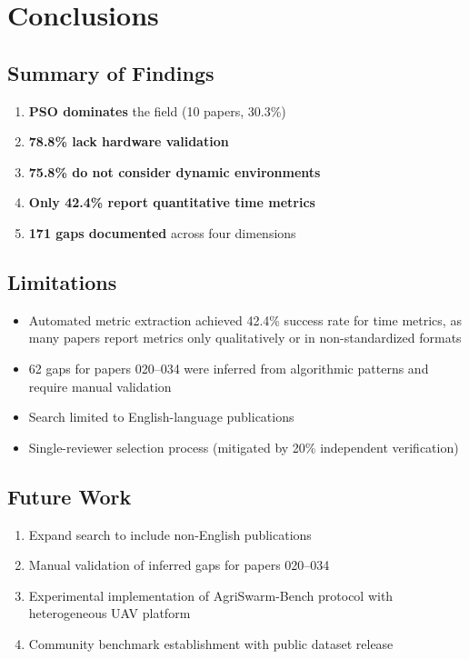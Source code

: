 \documentclass[review, 12pt, times]{elsarticle}
\begin{document}
\section{Conclusions}

\subsection{Summary of Findings}

\begin{enumerate}
  \item \textbf{PSO dominates} the field (10 papers, 30.3\%)
  \item \textbf{78.8\% lack hardware validation}
  \item \textbf{75.8\% do not consider dynamic environments}
  \item \textbf{Only 42.4\% report quantitative time metrics}
  \item \textbf{171 gaps documented} across four dimensions
\end{enumerate}

\subsection{Limitations}
\label{sec:limitations}

\begin{itemize}
  \item Automated metric extraction achieved 42.4\% success
  rate for time metrics, as many papers report metrics only
  qualitatively or in non-standardized formats
  \item 62 gaps for papers 020--034 were inferred from
  algorithmic patterns and require manual validation
  \item Search limited to English-language publications
  \item Single-reviewer selection process (mitigated by
  20\% independent verification)
\end{itemize}

\subsection{Future Work}

\begin{enumerate}
  \item Expand search to include non-English publications
  \item Manual validation of inferred gaps for papers
  020--034
  \item Experimental implementation of AgriSwarm-Bench
  protocol with heterogeneous UAV platform
  \item Community benchmark establishment with public
  dataset release
\end{enumerate}
\end{document}
